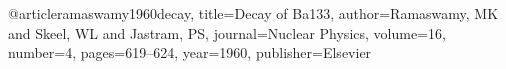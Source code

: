 @article{ramaswamy1960decay,
  title={Decay of Ba133},
  author={Ramaswamy, MK and Skeel, WL and Jastram, PS},
  journal={Nuclear Physics},
  volume={16},
  number={4},
  pages={619--624},
  year={1960},
  publisher={Elsevier}
}
